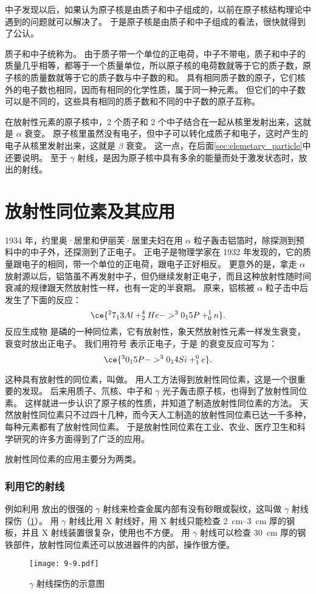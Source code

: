 中子发现以后，如果认为原子核是由质子和中子组成的，以前在原子核结构理论中遇到的问题就可以解决了。
于是原子核是由质子和中子组成的看法，很快就得到了公认。

质子和中子统称为。
由于质子带一个单位的正电荷，中子不带电，质子和中子的质量几乎相等，都等于一个质量单位，所以原子核的电荷数就等于它的质子数，原子核的质量数就等于它的质子数与中子数的和。
具有相同质子数的原子，它们核外的电子数也相同，因而有相同的化学性质，属于同一种元素。
但它们的中子数可以是不同的，这些具有相同的质子数和不同的中子数的原子互称。

在放射性元素的原子核中，2 个质子和 2 个中子结合在一起从核里发射出来，这就是 $\alpha$ 衰变。
原子核里虽然没有电子，但中子可以转化成质子和电子，这时产生的电子从核里发射出来，这就是 $\beta$ 衰变。
这一点，在后面\cref{sec:elemetary_particle}中还要说明。
至于 $\gamma$ 射线，是因为原子核中具有多余的能量而处于激发状态时，放出的射线。

\section{放射性同位素及其应用}
1934 年，约里奥·居里和伊丽芙·居里夫妇在用 $\alpha$ 粒子轰击铝箔时，除探测到预料中的中子外，还探测到了正电子。
正电子是物理学家在 1932 年发现的，它的质量跟电子的相同，带一个单位的正电荷，跟电子正好相反。
更意外的是，拿走 $\alpha$ 放射源以后，铝箔虽不再发射中子，但仍继续发射正电子，而且这种放射性随时间衰减的规律跟天然放射性一样，也有一定的半衰期。
原来，铝核被 $\alpha$ 粒子击中后发生了下面的反应：
\[ \ce {^27_13Al + ^4_2He -> ^30_15P +^1_0n }.\]
反应生成物  是磷的一种同位素，它有放射性，象天然放射性元素一样发生衰变，衰变时放出正电子。
我们用符号  表示正电子，于是  的衰变反应可写为：
\[ \ce{ ^30_15P  -> ^30_14Si + ^0_1e}.\]

这种具有放射性的同位素，叫做。
用人工方法得到放射性同位素，这是一个很重要的发现。
后来用质子、氘核、中子和 $\gamma$ 光子轰击原子核，也得到了放射性同位素。
这样就进一步认识了原子核的性质，并知道了制造放射性同位素的方法。
天然放射性同位素只不过四十几种，而今天人工制造的放射性同位素已达一千多种，每种元素都有了放射性同位素。
于是放射性同位素在工业、农业、医疗卫生和科学研究的许多方面得到了广泛的应用。

放射性同位素的应用主要分为两类。
\subsubsection{利用它的射线}
例如利用  放出的很强的 $\gamma$ 射线来检查金属内部有没有砂眼或裂纹，这叫做 $\gamma$ 射线探伤（\cref{fig:9-9}）。
用 $\gamma$ 射线比用 X 射线好，用 X 射线只能检查 \qtyrange{2}{3}{cm} 厚的钢板，并且 X 射线装置很复杂，使用也不方便。
用 $\gamma$ 射线可以检查 \qty{30}{cm} 厚的钢铁部件，放射性同位素还可以放进器件的内部，操作很方便。
\begin{figure}
  \texttt{[image: 9-9.pdf]}
\caption{$\gamma$ 射线探伤的示意图}\label{fig:9-9}
\end{figure}

